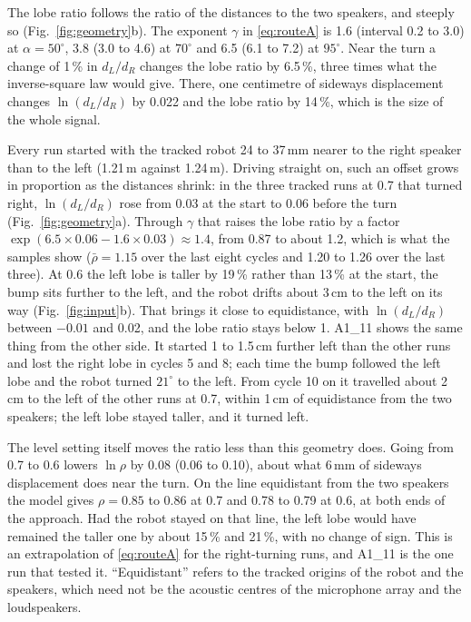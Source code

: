\documentclass[11pt,a4paper]{article}
\begin{document}
The lobe ratio follows the ratio of the distances to the two speakers, and steeply so
(Fig.~\ref{fig:geometry}b). The exponent $\gamma$ in \eqref{eq:routeA} is 1.6 (interval 0.2 to 3.0) at
$\alpha=50^\circ$, 3.8 (3.0 to 4.6) at $70^\circ$ and 6.5 (6.1 to 7.2) at $95^\circ$. Near the turn a change of 1\,\% in
$d_L/d_R$ changes the lobe ratio by 6.5\,\%, three times what the inverse-square law would give. There, one
centimetre of sideways displacement changes $\ln(d_L/d_R)$ by 0.022 and the lobe ratio by 14\,\%, which is the size
of the whole signal.

Every run started with the tracked robot 24 to 37\,mm nearer to the right speaker than to the left (1.21\,m against
1.24\,m). Driving straight on, such an offset grows in proportion as the distances shrink: in the three tracked runs
at 0.7 that turned right, $\ln(d_L/d_R)$ rose from 0.03 at the start to 0.06 before the turn
(Fig.~\ref{fig:geometry}a). Through $\gamma$ that raises the lobe ratio by a factor
$\exp(6.5\times0.06-1.6\times0.03)\approx1.4$, from 0.87 to about 1.2, which is what the samples show
($\bar\rho=1.15$ over the last eight cycles and 1.20 to 1.26 over the last three). At 0.6 the left lobe is taller by
19\,\% rather than 13\,\% at the start, the bump sits further to the left, and the robot drifts about 3\,cm to the left
on its way (Fig.~\ref{fig:input}b). That brings it close to equidistance, with $\ln(d_L/d_R)$ between $-0.01$ and
0.02, and the lobe ratio stays below 1. A1\_11 shows the same thing from the other side. It started 1 to 1.5\,cm further left
than the other runs and lost the right lobe in cycles 5 and 8; each time the bump followed the left lobe and the
robot turned $21^\circ$ to the left. From cycle 10 on it travelled about 2\,cm to the left of the other runs at 0.7,
within 1\,cm of equidistance from the two speakers; the left lobe stayed taller, and it turned left.

The level setting itself moves the ratio less than this geometry does. Going from 0.7 to 0.6 lowers $\ln\rho$ by
0.08 (0.06 to 0.10), about what 6\,mm of sideways displacement does near the turn. On the line equidistant from
the two speakers the model gives $\rho=0.85$ to 0.86 at 0.7 and 0.78 to 0.79 at 0.6, at both ends of the approach. Had
the robot stayed on that line, the left lobe would have remained the taller one by about 15\,\% and 21\,\%, with no
change of sign. This is an extrapolation of \eqref{eq:routeA} for the right-turning runs, and A1\_11 is the one run
that tested it. ``Equidistant'' refers to the tracked origins of the robot and the speakers, which need not be
the acoustic centres of the microphone array and the loudspeakers.
\end{document}
